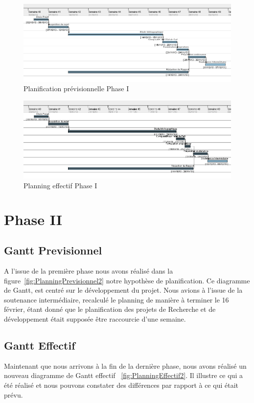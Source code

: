\documentclass[11pt, french,screen]{report-rd-info}
\begin{document}
\begin{figure}
	\centering
		\includegraphics[width=1\textwidth]{Gantts/p1_previsionnel}
	\caption{Planification prévisionnelle Phase I}
	\label{fig:PlanningPrevisionnel}
\end{figure}
\begin{figure}
	\centering
		\includegraphics[width=1\textwidth]{Gantts/p1_effectif}
	\caption{Planning effectif Phase I}
	\label{fig:PlanningEffectif}
\end{figure}



\section{Phase II}
\subsection{Gantt Previsionnel}
A l'issue de la première phase nous avons réalisé dans la figure~\ref{fig:PlanningPrevisionnel2} notre hypothèse de planification. Ce diagramme de Gantt, est centré sur le développement du projet. Nous avions à l'issue de la soutenance intermédiaire, recalculé le planning de manière à terminer le 16 février, étant donné que le planification des projets de Recherche et de développement était supposée être raccourcie d'une semaine. 

\subsection{Gantt Effectif}
Maintenant que nous arrivons à la fin de la dernière phase, nous avons réalisé un nouveau diagramme de Gantt effectif ~\ref{fig:PlanningEffectif2}. Il illustre ce qui a été réalisé et nous pouvons constater des différences par rapport à ce qui était prévu.
\end{document}
